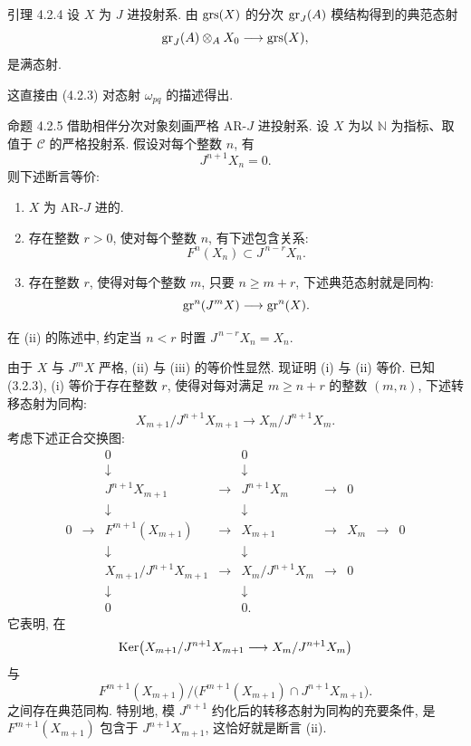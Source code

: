 \begin{statement}{引理 4.2.4}
设 \(X\) 为 \(J\) 进投射系. 由 \(\operatorname{grs}(X)\) 的分次 \(\operatorname{gr}_J(A)\) 模结构得到的典范态射
\[
\operatorname{gr}_J(A)\otimes_A X_0\longrightarrow \operatorname{grs}(X),
\]
是满态射.
\end{statement}

\begin{prooftext}
这直接由 (4.2.3) 对态射 \(\omega_{pq}\) 的描述得出.
\end{prooftext}

\begin{statement}{命题 4.2.5}
借助相伴分次对象刻画严格 AR-\(J\) 进投射系. 设 \(X\) 为以 \(\mathbb N\) 为指标、取值于 \(\mathcal C\) 的严格投射系. 假设对每个整数 \(n\), 有
\[
J^{n+1}X_n=0.
\]
则下述断言等价:
\begin{enumerate}[label=\textup{(\roman*)}]
\item \(X\) 为 AR-\(J\) 进的.
\item 存在整数 \(r>0\), 使对每个整数 \(n\), 有下述包含关系:
\[
F^n(X_n)\subset J^{\,n-r}X_n.
\]
\item 存在整数 \(r\), 使得对每个整数 \(m\), 只要 \(n\ge m+r\), 下述典范态射就是同构:
\[
\operatorname{gr}^n(J^mX)\longrightarrow \operatorname{gr}^n(X).
\]
\end{enumerate}
在 (ii) 的陈述中, 约定当 \(n<r\) 时置 \(J^{\,n-r}X_n=X_n\).
\end{statement}

\begin{prooftext}
由于 \(X\) 与 \(J^mX\) 严格, (ii) 与 (iii) 的等价性显然. 现证明 (i) 与 (ii) 等价. 已知 (3.2.3), (i) 等价于存在整数 \(r\), 使得对每对满足 \(m\ge n+r\) 的整数 \((m,n)\), 下述转移态射为同构:
\[
X_{m+1}/J^{n+1}X_{m+1}\longrightarrow X_m/J^{n+1}X_m.
\]
考虑下述正合交换图:
\[
\begin{array}{ccccccccccc}
&&0&&0\\
&&\downarrow&&\downarrow\\
&&J^{n+1}X_{m+1}&\longrightarrow&J^{n+1}X_m&\longrightarrow&0\\
&&\downarrow&&\downarrow\\
0&\longrightarrow&F^{m+1}(X_{m+1})&\longrightarrow&X_{m+1}&\longrightarrow&X_m&\longrightarrow&0\\
&&\downarrow&&\downarrow\\
&&X_{m+1}/J^{n+1}X_{m+1}&\longrightarrow&X_m/J^{n+1}X_m&\longrightarrow&0\\
&&\downarrow&&\downarrow\\
&&0&&0 .
\end{array}
\]
它表明, 在
\[
\operatorname{Ker}\bigl(X_{m+1}/J^{n+1}X_{m+1}
       \longrightarrow X_m/J^{n+1}X_m\bigr)
\]
与
\[
F^{m+1}(X_{m+1})/
\bigl(F^{m+1}(X_{m+1})\cap J^{n+1}X_{m+1}\bigr).
\]
之间存在典范同构. 特别地, 模 \(J^{n+1}\) 约化后的转移态射为同构的充要条件, 是 \(F^{m+1}(X_{m+1})\) 包含于 \(J^{n+1}X_{m+1}\), 这恰好就是断言 (ii).
\end{prooftext}

